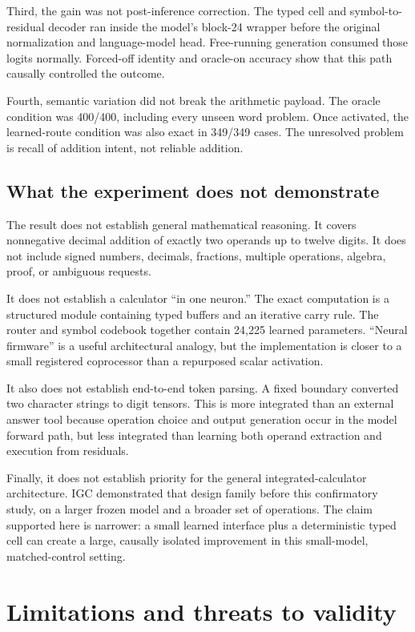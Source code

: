 \documentclass[11pt]{article}
\begin{document}
Third, the gain was not post-inference correction. The typed cell and
symbol-to-residual decoder ran inside the model's block-24 wrapper before the
original normalization and language-model head. Free-running generation
consumed those logits normally. Forced-off identity and oracle-on accuracy
show that this path causally controlled the outcome.

Fourth, semantic variation did not break the arithmetic payload. The oracle
condition was 400/400, including every unseen word problem. Once activated,
the learned-route condition was also exact in 349/349 cases. The unresolved
problem is recall of addition intent, not reliable addition.

\subsection{What the experiment does not demonstrate}

The result does not establish general mathematical reasoning. It covers
nonnegative decimal addition of exactly two operands up to twelve digits. It
does not include signed numbers, decimals, fractions, multiple operations,
algebra, proof, or ambiguous requests.

It does not establish a calculator ``in one neuron.'' The exact computation is
a structured module containing typed buffers and an iterative carry rule. The
router and symbol codebook together contain 24,225 learned parameters.
``Neural firmware'' is a useful architectural analogy, but the implementation
is closer to a small registered coprocessor than a repurposed scalar activation.

It also does not establish end-to-end token parsing. A fixed boundary converted
two character strings to digit tensors. This is more integrated than an
external answer tool because operation choice and output generation occur in
the model forward path, but less integrated than learning both operand
extraction and execution from residuals.

Finally, it does not establish priority for the general integrated-calculator
architecture. IGC demonstrated that design family before this confirmatory
study, on a larger frozen model and a broader set of operations. The claim
supported here is narrower: a small learned interface plus a deterministic
typed cell can create a large, causally isolated improvement in this
small-model, matched-control setting.

\section{Limitations and threats to validity}
\end{document}
